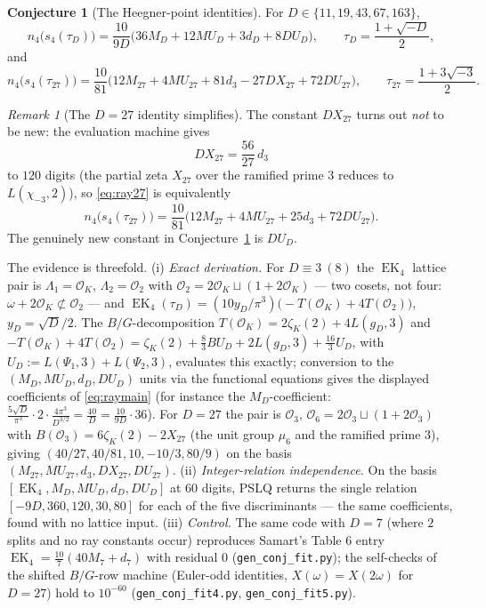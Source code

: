 \documentclass[11pt]{article}
\newcommand{\OO}{\mathcal{O}}
\DeclareMathOperator{\EK}{EK}
\theoremstyle{definition}
\newtheorem{conjecture}[theorem]{Conjecture}
\theoremstyle{remark}
\newtheorem{remark}[theorem]{Remark}
\begin{document}
\begin{conjecture}[The Heegner-point identities]\label{conj:ray}
For $D\in\{11,19,43,67,163\}$,
\begin{equation}\label{eq:raymain}
n_4\bigl(s_4(\tau_D)\bigr)
=\frac{10}{9D}\bigl(36M_D+12MU_D+3d_D+8DU_D\bigr),
\qquad \tau_D=\frac{1+\sqrt{-D}}2,
\end{equation}
and
\begin{equation}\label{eq:ray27}
n_4\bigl(s_4(\tau_{27})\bigr)
=\frac{10}{81}\bigl(12M_{27}+4MU_{27}+81d_3-27DX_{27}+72DU_{27}\bigr),
\qquad \tau_{27}=\frac{1+3\sqrt{-3}}2.
\end{equation}
\end{conjecture}

\begin{remark}[The $D=27$ identity simplifies]\label{rem:dx27}
The constant $DX_{27}$ turns out \emph{not} to be new: the
evaluation machine gives
\[
  DX_{27}=\frac{56}{27}\,d_3
\]
to $120$ digits (the partial zeta $X_{27}$ over the ramified prime
$3$ reduces to $L(\chi_{-3},2)$), so \eqref{eq:ray27} is
equivalently
\[
n_4\bigl(s_4(\tau_{27})\bigr)
=\frac{10}{81}\bigl(12M_{27}+4MU_{27}+25d_3+72DU_{27}\bigr).
\]
The genuinely new constant in Conjecture~\ref{conj:ray} is $DU_D$.
\end{remark}

The evidence is threefold.
(i) \emph{Exact derivation.} For $D\equiv3\ (8)$ the $\EK_4$ lattice
pair is $\Lambda_1=\OO_K$, $\Lambda_2=\OO_2$ with
$\OO_2=2\OO_K\sqcup(1+2\OO_K)$ --- two cosets, not four:
$\omega+2\OO_K\not\subset\OO_2$ --- and
$\EK_4(\tau_D)=(10y_D/\pi^3)\bigl(-T(\OO_K)+4T(\OO_2)\bigr)$,
$y_D=\sqrt D/2$. The $B/G$-decomposition
$T(\OO_K)=2\zeta_K(2)+4L(g_D,3)$ and
$-T(\OO_K)+4T(\OO_2)
=\zeta_K(2)+\tfrac83BU_D+2L(g_D,3)+\tfrac{16}3U_D$,
with $U_D:=L(\Psi_1,3)+L(\Psi_2,3)$, evaluates this exactly;
conversion to the $(M_D,MU_D,d_D,DU_D)$ units via the functional
equations gives the displayed coefficients of \eqref{eq:raymain}
(for instance the $M_D$-coefficient:
$\tfrac{5\sqrt D}{\pi^3}\cdot2\cdot\tfrac{4\pi^3}{D^{3/2}}
=\tfrac{40}{D}=\tfrac{10}{9D}\cdot36$).
For $D=27$ the pair is $\OO_3$, $\OO_6=2\OO_3\sqcup(1+2\OO_3)$ with
$B(\OO_3)=6\zeta_K(2)-2X_{27}$ (the unit group $\mu_6$ and the
ramified prime $3$), giving $(40/27,40/81,10,-10/3,80/9)$ on the
basis $(M_{27},MU_{27},d_3,DX_{27},DU_{27})$.
(ii) \emph{Integer-relation independence.} On the basis
$[\EK_4,M_D,MU_D,d_D,DU_D]$ at $60$ digits, PSLQ returns the single
relation $[-9D,\allowbreak360,\allowbreak120,\allowbreak30,
\allowbreak80]$ for each of the five discriminants --- the same
coefficients, found with no lattice input.
(iii) \emph{Control.} The same code with $D=7$ (where $2$ splits and
no ray constants occur) reproduces Samart's Table 6 entry
$\EK_4=\frac{10}{7}(40M_7+d_7)$ with residual $0$
(\texttt{gen\_conj\_fit.py}); the self-checks of the shifted
$B/G$-row machine (Euler-odd identities, $X(\omega)=X(2\omega)$ for
$D=27$) hold to $10^{-60}$ (\texttt{gen\_conj\_fit4.py},
\texttt{gen\_conj\_fit5.py}).
\end{document}
